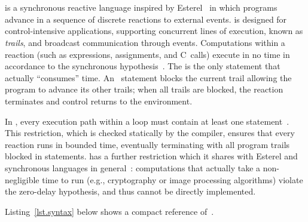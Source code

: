 \section{\CEU}
\label{sec.ceu}

\CEU is a synchronous reactive language inspired by
Esterel~\cite{esterel.ieee91} in which programs advance in a sequence of
discrete reactions to external events.
%
\CEU is designed for control-intensive applications, supporting concurrent
lines of execution, known as \emph{trails}, and broadcast communication
through events.
%
Computations within a reaction (such as expressions, assignments, and
C~calls) execute in no time in accordance to the synchronous
hypothesis~\cite{rp.hypothesis}.
%
The  is the only \CEU statement that actually ``consumes'' time.
An~ statement blocks the current trail allowing the program to
advance its other trails; when all trails are blocked, the reaction
terminates and control returns to the environment.

In \CEU, every execution path within a loop must contain at least one
 statement~\cite{ceu.sensys13,esterel.primer}.
%
This restriction, which is checked statically by the \CEU compiler, ensures
that every reaction runs in bounded time, eventually terminating with all
program trails blocked in  statements.
%
\CEU has a further restriction which it shares with Esterel and synchronous
languages in general~\cite{esterel.preemption}: computations that actually
take a non-negligible time to run (e.g., cryptography or image processing
algorithms) violate the zero-delay hypothesis, and thus cannot be directly
implemented.

Listing~\ref{lst.syntax} below shows a compact reference of~\CEU.

